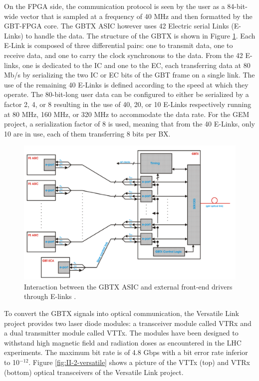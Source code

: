       On the FPGA side, the communication protocol is seen by the user as a 84-bit-wide vector that is sampled at a frequency of 40 MHz and then formatted by the GBT-FPGA core. The GBTX ASIC however uses 42 Electric serial Links (E-Links) to handle the data. The structure of the GBTX is shown in Figure \ref{fig:II-2-gbt-asic}. Each E-Link is composed of three differential pairs: one to transmit data, one to receive data, and one to carry the clock synchronous to the data. From the 42 E-links, one is dedicated to the IC and one to the EC, each transferring data at 80 Mb/s by serializing the two IC or EC bits of the GBT frame on a single link. The use of the remaining 40 E-Links is defined according to the speed at which they operate. The 80-bit-long user data can be configured to either be serialized by a factor 2, 4, or 8 resulting in the use of 40, 20, or 10 E-Links respectively running at 80 MHz, 160 MHz, or 320 MHz to accommodate the data rate. For the GEM project, a serialization factor of 8 is used, meaning that from the 40 E-Links, only 10 are in use, each of them transferring 8 bits per BX. \\

      \begin{figure}[t!]
        \centering
        \includegraphics[width=\textwidth]{img/II-2-daq/gbt-asic.png}
        \caption{Interaction between the GBTX ASIC and external front-end drivers through E-links \cite{Moreira:1235836}.}
        \label{fig:II-2-gbt-asic}
      \end{figure}

      To convert the GBTX signals into optical communication, the Versatile Link project provides two laser diode modules: a transceiver module called VTRx and a dual transmitter module called VTTx. The modules have been designed to withstand high magnetic field and radiation doses as encountered in the LHC experiments. The maximum bit rate is of 4.8 Gbps with a bit error rate inferior to 10$^{-12}$. Figure \ref{fig:II-2-versatile} shows a picture of the VTTx (top) and VTRx (bottom) optical transceivers of the Versatile Link project.

